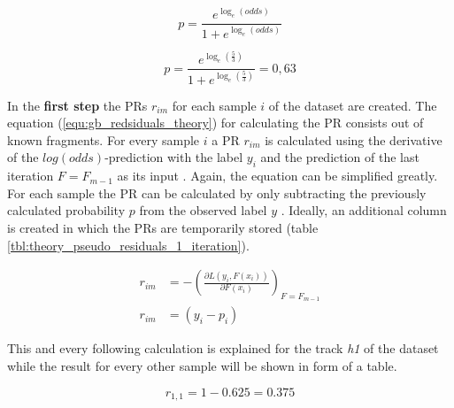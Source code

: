 \begin{equation}
    p = \frac{e^{\log_{e}(odds)}}{1 + e^{\log_{e}(odds)}} 
    \label{equ:gb_prediction}
\end{equation}

\begin{equation*}
    p = \frac{e^{\log_{e}(\frac{5}{3})}}{1 + e^{\log_{e}(\frac{5}{3})}} = 0,63
\end{equation*}

In the \textbf{first step} the \acp{PR} \(r_{im}\) for each sample \(i\) of the dataset are created. The equation (\ref{equ:gb_redsiduals_theory}) 
for calculating the \ac{PR} consists out of known fragments. For every sample \(i\) a PR \(r_{im}\) 
is calculated using the derivative of the \(log(odds)\)-prediction with the label \(y_{i}\) and the 
prediction of the last iteration \(F = F_{m - 1}\) as its input \cite[p.361]{Hastie_2009}. Again, the equation can be 
simplified greatly. For each sample the \ac{PR} can be calculated by only 
subtracting the previously calculated probability \(p\) from the observed label \(y\) \cite{parr2022gb_explained_hrd} \cite{parr2022gb_explained_gbd}. Ideally, an additional 
column is created in which the PRs are temporarily stored (table \ref{tbl:theory_pseudo_residuals_1_iteration}). 

\begin{equation}
    \begin{aligned}
        r_{im} &= - (\frac{\partial L(y_{i}, F(x_{i}))}{\partial F(x_{i})})_{F = F_{m - 1}}
        \\
        r_{im} &= (y_{i} - p_{i})
        \label{equ:gb_redsiduals_theory}
    \end{aligned}
\end{equation}

This and every following calculation is explained for the track \emph{h1} of the dataset while the result for 
every other sample will be shown in form of a table. 

\begin{equation*}
r_{1,1} = 1 - 0.625 = 0.375
\end{equation*}

